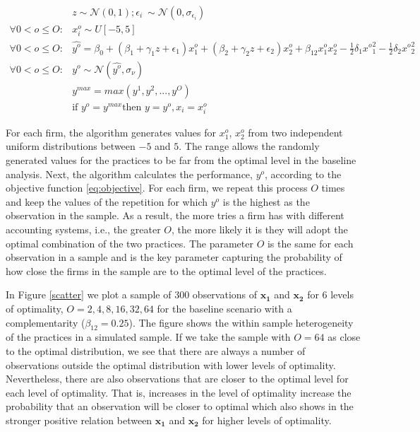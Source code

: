 \documentclass[12pt]{article}
\begin{document}
\begin{equation}\label{eq:firm-simulation}
\begin{aligned}
	&z \sim \mathcal{N}(0, 1); \epsilon_i ~ \sim \mathcal{N}(0, \sigma_{\epsilon_i}) \\
    \forall 0 < o \leq O: &x^o_i \sim U[-5,5] \\
    \forall 0 < o \leq O: &\hat{y^o} = \beta_0 + (\beta_{1} + \gamma_1 z + \epsilon_1) x^o_1 
						+ (\beta_{2} + \gamma_2 z  + \epsilon_2) x^o_2 
                        + \beta_{12} x^o_1 x^o_2 - \frac{1}{2}\delta_1 {x^o}^2_1 - \frac{1}{2}\delta_2 {x^o}^2_2 \\
     \forall 0 < o \leq O: &y^o \sim \mathcal{N}(\hat{y^o}, \sigma_{\nu}) \\
	 &y^{max} = max(y^1, y^2, ..., y^O)  \\
     &\text{if } y^o = y^{max} \text{then } y = y^o, x_i = x^o_i
\end{aligned}
\end{equation}


For each firm, the algorithm generates values for $x^o_{1}$, $x^o_{2}$ from two independent uniform distributions between $-5$ and $5$. The range allows the randomly generated values for the practices to be far from the optimal level in the baseline analysis. Next, the algorithm calculates the performance, $y^o$, according to the objective function \eqref{eq:objective}. For each firm, we repeat this process $O$ times and keep the values of the repetition for which $y^o$ is the highest as the observation in the sample. As a result, the more tries a firm has with different accounting systems, i.e., the greater $O$, the more likely it is they will adopt the optimal combination of the two practices. The parameter $O$ is the same for each observation in a sample and is the key parameter capturing the probability of how close the firms in the sample are to the optimal level of the practices. 

In Figure \ref{scatter} we plot a sample of 300 observations of $\mathbf{x_1}$ and $\mathbf{x_2}$ for 6 levels of optimality, $O = 2, 4, 8, 16, 32, 64$ for the baseline scenario with a complementarity ($\beta_{12} = 0.25$). The figure shows the within sample heterogeneity of the practices in a simulated sample. If we take the sample with $O=64$ as close to the optimal distribution, we see that there are always a number of observations outside the optimal distribution with lower levels of optimality. Nevertheless, there are also observations that are closer to the optimal level for each level of optimality. That is, increases in the level of optimality increase the probability that an observation will be closer to optimal which also shows in the stronger positive relation between $\mathbf{x_1}$ and $\mathbf{x_2}$ for higher levels of optimality.
\end{document}
